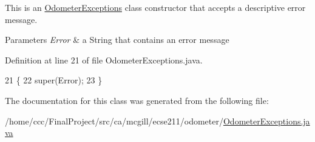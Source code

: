 This is an \hyperlink{classca_1_1mcgill_1_1ecse211_1_1odometer_1_1_odometer_exceptions}{Odometer\+Exceptions} class constructor that accepts a descriptive error message.


\begin{DoxyParams}{Parameters}
{\em Error} & a String that contains an error message \\
\hline
\end{DoxyParams}


Definition at line 21 of file Odometer\+Exceptions.\+java.


\begin{DoxyCode}
21                                           \{
22     super(Error);
23   \}
\end{DoxyCode}


The documentation for this class was generated from the following file\+:\begin{DoxyCompactItemize}
\item 
/home/ccc/\+Final\+Project/src/ca/mcgill/ecse211/odometer/\hyperlink{_odometer_exceptions_8java}{Odometer\+Exceptions.\+java}\end{DoxyCompactItemize}
